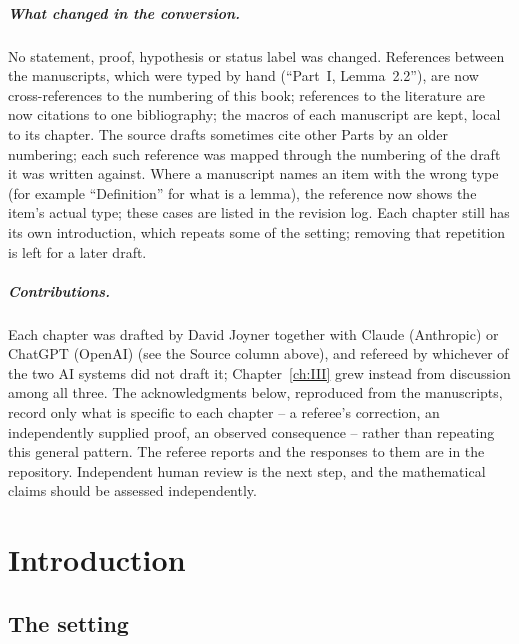 \documentclass[11pt,oneside]{book}
\theoremstyle{plain}
\theoremstyle{definition}
\begin{document}
\paragraph{What changed in the conversion.}  No statement, proof,
hypothesis or status label was changed.  References between the
manuscripts, which were typed by hand (``Part~I, Lemma~2.2''), are now
cross-references to the numbering of this book; references to the
literature are now citations to one bibliography; the macros of each
manuscript are kept, local to its chapter.  The source drafts sometimes
cite other Parts by an older numbering; each such reference was mapped
through the numbering of the draft it was written against.  Where a
manuscript names an item with the wrong type (for example
``Definition'' for what is a lemma), the reference now shows the
item's actual type; these cases are listed in the revision log.  Each
chapter still has its own introduction, which repeats some of the
setting; removing that repetition is left for a later draft.

\paragraph{Contributions.}  Each chapter was drafted by David Joyner
together with Claude (Anthropic) or ChatGPT (OpenAI) (see the Source
column above), and refereed by whichever of the two AI systems did not
draft it; Chapter~\ref{ch:III} grew instead from discussion among all
three.  The acknowledgments below, reproduced from the manuscripts,
record only what is specific to each chapter -- a referee's correction,
an independently supplied proof, an observed consequence -- rather than
repeating this general pattern.  The referee reports and the responses
to them are in the repository.  Independent human review is the next
step, and the mathematical claims should be assessed independently.



\mainmatter
\chapter{Introduction}\label{ch:intro}
\section{The setting}\label{sec:setting}
\end{document}
